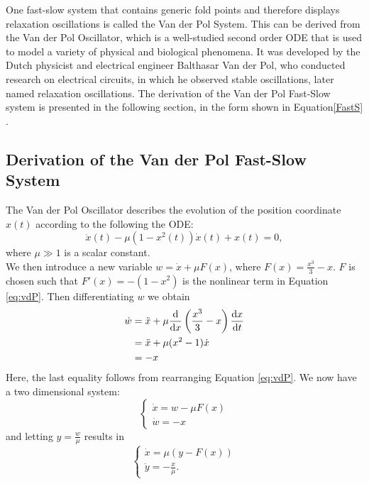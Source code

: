 
One fast-slow system that contains generic fold points and therefore displays relaxation oscillations is called the Van der Pol System. This can be derived from the Van der Pol Oscillator, which is a well-studied second order ODE that is used to model a variety of physical and biological phenomena. It was developed by the Dutch physicist and electrical engineer Balthasar Van der Pol, who conducted research on electrical circuits, in which he observed stable oscillations, later named relaxation oscillations. The derivation of the Van der Pol Fast-Slow system is presented in the following section, in the form shown in Equation\ref{FastS} .

\subsection{Derivation of the Van der Pol Fast-Slow System}

The Van der Pol Oscillator describes the evolution of the position coordinate \(x(t)\) according to the following the ODE:
\begin{equation} \label{eq:vdP}
\ddot{x}(t)-\mu\left(1-x^2(t)\right)\dot{x}(t)+x(t)=0,   
\end{equation}
where \(\mu \gg 1\) is a scalar constant. \\

We then introduce a new variable \(w=\dot{x}+\mu F(x)\), where \(F(x)=\frac{x^3}{3}-x\). $F$ is chosen such that  \(F'(x)=-(1-x^2)\) is the nonlinear term in Equation \ref{eq:vdP}. Then differentiating \(w\) we obtain
\begin{align*}
\dot{w}&=\ddot{x}+\mu\od{}{x}\left(\frac{x^3}{3}-x\right)\od{x}{t}\\
& =\ddot{x}+\mu(x^2-1)\dot{x}\\
&= -x
\end{align*}
Here, the last equality follows from rearranging Equation \ref{eq:vdP}. We now have a two dimensional system:
\[\begin{cases} \dot{x}=w-\mu F(x)\\
\dot{w}=-x\end{cases}\]
and letting \(y=\frac{w}{\mu}\) results in
\[\begin{cases} \dot{x}=\mu\left(y-F(x)\right)\\
\dot{y}=-\frac{x}{\mu}.\end{cases}\]

